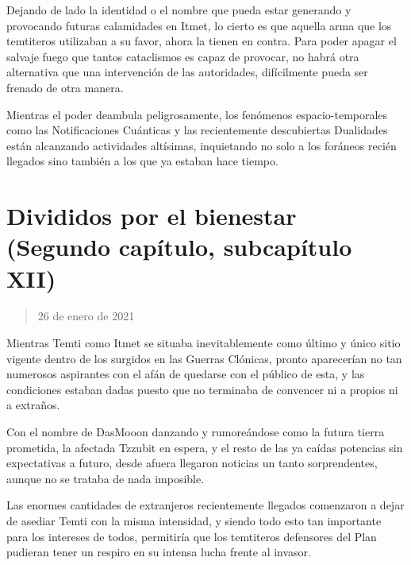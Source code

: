 \documentclass[
  spanish,
]{book}
\begin{document}
Dejando de lado la identidad o el nombre que pueda estar generando y provocando futuras calamidades en Itmet, lo cierto es que aquella arma que los temtiteros utilizaban a su favor, ahora la tienen en contra. Para poder apagar el salvaje fuego que tantos cataclismos es capaz de provocar, no habrá otra alternativa que una intervención de las autoridades, difícilmente pueda ser frenado de otra manera.

Mientras el poder deambula peligrosamente, los fenómenos espacio-temporales como las Notificaciones Cuánticas y las recientemente descubiertas Dualidades están alcanzando actividades altísimas, inquietando no solo a los foráneos recién llegados sino también a los que ya estaban hace tiempo.

\hypertarget{divididos-por-el-bienestar-segundo-capuxedtulo-subcapuxedtulo-xii}{%
\section{Divididos por el bienestar (Segundo capítulo, subcapítulo XII)}\label{divididos-por-el-bienestar-segundo-capuxedtulo-subcapuxedtulo-xii}}

\begin{quote}
26 de enero de 2021
\end{quote}

Mientras Temti como Itmet se situaba inevitablemente como último y único sitio vigente dentro de los surgidos en las Guerras Clónicas, pronto aparecerían no tan numerosos aspirantes con el afán de quedarse con el público de esta, y las condiciones estaban dadas puesto que no terminaba de convencer ni a propios ni a extraños.

Con el nombre de DasMooon danzando y rumoreándose como la futura tierra prometida, la afectada Tzzubit en espera, y el resto de las ya caídas potencias sin expectativas a futuro, desde afuera llegaron noticias un tanto sorprendentes, aunque no se trataba de nada imposible.

Las enormes cantidades de extranjeros recientemente llegados comenzaron a dejar de asediar Temti con la misma intensidad, y siendo todo esto tan importante para los intereses de todos, permitiría que los temtiteros defensores del Plan pudieran tener un respiro en su intensa lucha frente al invasor.
\end{document}
